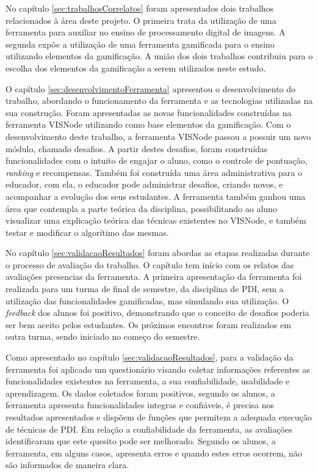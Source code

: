 \documentclass[
	12pt,				%
	oneside,			%
	a4paper,			%
	english,			%
	french,				%
	spanish,			%
	brazil,				%
	]{abntex2}
\begin{document}
No capítulo \ref{sec:trabalhosCorrelatos} foram apresentados dois trabalhos relacionados à área deste projeto. O primeira trata da utilização de uma ferramenta para auxiliar no ensino de processamento digital de imagens. A segunda expõe a utilização de uma ferramenta gamificada para o ensino utilizando elementos da gamificação. A união dos dois trabalhos contribuiu para o escolha dos elementos da gamificação a serem utilizados neste estudo.

O capítulo \ref{sec:desenvolvimentoFerramenta} apresentou o desenvolvimento do trabalho, abordando o funcionamento da ferramenta e as tecnologias utilizadas na sua construção. Foram apresentadas as novas funcionalidades construídas na ferramenta VISNode utilizando como base elementos da gamificação. Com o desenvolvimento deste trabalho, a ferramenta VISNode passou a possuir um novo módulo, chamado desafios. A partir destes desafios, foram construídas funcionalidades com o intuito de engajar o aluno, como o controle de pontuação, \textit{ranking} e recompensas. Também foi construída uma área administrativa para o educador, com ela, o educador pode administrar desafios, criando novos, e acompanhar a evolução dos seus estudantes. A ferramenta também ganhou uma área que contempla a parte teórica da disciplina, possibilitando ao aluno visualizar uma explicação teórica das técnicas existentes no VISNode, e também testar e modificar o algorítimo das mesmas.

No capítulo \ref{sec:validacaoResultados} foram abordas as etapas realizadas durante o processo de avaliação do trabalho. O capítulo tem início com os relatos das avaliações presencias da ferramenta. A primeira apresentação da ferramenta foi realizada para um turma de final de semestre, da disciplina de PDI, sem a utilização das funcionalidades gamificadas, mas simulando sua utilização. O \textit{feedback} dos alunos foi positivo, demonstrando que o conceito de desafios poderia ser bem aceito pelos estudantes. Os próximos encontros foram realizados em outra turma, sendo iniciado no começo do semestre.

Como apresentado no capítulo \ref{sec:validacaoResultados}, para a validação da ferramenta foi aplicado um questionário visando coletar informações referentes as funcionalidades existentes na ferramenta, a sua confiabilidade, usabilidade e aprendizagem. Os dados coletados foram positivos, segundo os alunos, a ferramenta apresenta funcionalidades integras e confiáveis, é precisa nos resultados apresentados e dispõem de funções que permitem a adequada execução de técnicas de PDI. Em relação a confiabilidade da ferramenta, as avaliações identificaram que este quesito pode ser melhorado. Segundo os alunos, a ferramenta, em alguns casos, apresenta erros e quando estes erros ocorrem, não são informados de maneira clara.
\end{document}
